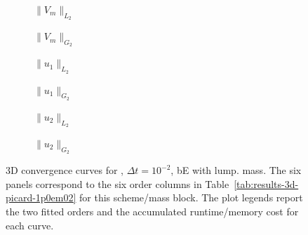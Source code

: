 \begin{figure}[p]
\centering
\begin{subfigure}{0.485\linewidth}
\centering
{}
\caption{$\|V_m\|_{L_2}$}
\label{fig:results-3d-picard-1p0em02-backwardeuler-lumped-a}
\end{subfigure}
\hfill
\begin{subfigure}{0.485\linewidth}
\centering
{}
\caption{$\|V_m\|_{G_2}$}
\label{fig:results-3d-picard-1p0em02-backwardeuler-lumped-b}
\end{subfigure}
\par\vspace{0.8em}
\begin{subfigure}{0.485\linewidth}
\centering
{}
\caption{$\|u_1\|_{L_2}$}
\label{fig:results-3d-picard-1p0em02-backwardeuler-lumped-c}
\end{subfigure}
\hfill
\begin{subfigure}{0.485\linewidth}
\centering
{}
\caption{$\|u_1\|_{G_2}$}
\label{fig:results-3d-picard-1p0em02-backwardeuler-lumped-d}
\end{subfigure}
\par\vspace{0.8em}
\begin{subfigure}{0.485\linewidth}
\centering
{}
\caption{$\|u_2\|_{L_2}$}
\label{fig:results-3d-picard-1p0em02-backwardeuler-lumped-e}
\end{subfigure}
\hfill
\begin{subfigure}{0.485\linewidth}
\centering
{}
\caption{$\|u_2\|_{G_2}$}
\label{fig:results-3d-picard-1p0em02-backwardeuler-lumped-f}
\end{subfigure}
\caption{3D convergence curves for , $\Delta t=10^{-2}$, bE with lump. mass. The six panels correspond to the six order columns in Table~\ref{tab:results-3d-picard-1p0em02} for this scheme/mass block. The plot legends report the two fitted orders and the accumulated runtime/memory cost for each curve.}
\label{fig:results-3d-picard-1p0em02-backwardeuler-lumped}
\end{figure}
\FloatBarrier

